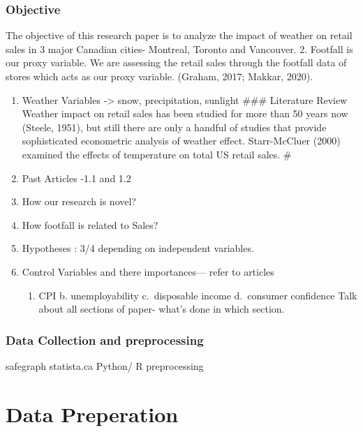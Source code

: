 \documentclass[
]{article}
\providecommand{\tightlist}{%
  \setlength{\itemsep}{0pt}\setlength{\parskip}{0pt}}
\begin{document}
\hypertarget{objective}{%
\subsubsection{Objective}\label{objective}}

The objective of this research paper is to analyze the impact of weather
on retail sales in 3 major Canadian cities- Montreal, Toronto and
Vancouver. 2. Footfall is our proxy variable. We are assessing the
retail sales through the footfall data of stores which acts as our proxy
variable. (Graham, 2017; Makkar, 2020).

\begin{enumerate}
\def\labelenumi{\arabic{enumi}.}
\setcounter{enumi}{2}
\item
  Weather Variables -\textgreater{} snow, precipitation, sunlight \#\#\#
  Literature Review Weather impact on retail sales has been studied for
  more than 50 years now (Steele, 1951), but still there are only a
  handful of studies that provide sophisticated econometric analysis of
  weather effect. Starr-McCluer (2000) examined the effects of
  temperature on total US retail sales. \#
\item
  Past Articles -1.1 and 1.2
\item
  How our research is novel?
\item
  How footfall is related to Sales?
\item
  Hypotheses : 3/4 depending on independent variables.
\item
  Control Variables and there importances--- refer to articles

  \begin{enumerate}
  \def\labelenumii{\alph{enumii}.}
  \tightlist
  \item
    CPI b. unemployability c.~disposable income d.~consumer confidence
    Talk about all sections of paper- what's done in which section.
  \end{enumerate}
\end{enumerate}

\hypertarget{data-collection-and-preprocessing}{%
\subsubsection{Data Collection and
preprocessing}\label{data-collection-and-preprocessing}}

safegraph statista.ca Python/ R preprocessing

\hypertarget{data-preperation}{%
\section{Data Preperation}\label{data-preperation}}
\end{document}
